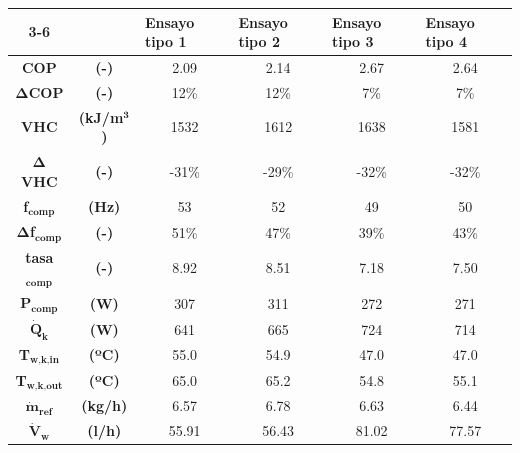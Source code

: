 
\begin{tabular}{cc|c|c|c|c|}
\cline{3-6}
\multicolumn{1}{l}{} & \multicolumn{1}{l|}{} & \multicolumn{1}{l|}{\textbf{Ensayo tipo 1}} & \multicolumn{1}{l|}{\textbf{Ensayo tipo 2}} & \multicolumn{1}{l|}{\textbf{Ensayo tipo 3}} & \multicolumn{1}{l|}{\textbf{Ensayo tipo 4}} \\ \hline
\multicolumn{1}{|c}{\textbf{COP}} & \textbf{(-)} & 2.09 & 2.14 & 2.67 & 2.64 \\ \hline
\multicolumn{1}{|c}{$\bm{\Delta}$\textbf{COP}} & \textbf{(-)} & 12\% & 12\% & 7\% & 7\% \\ \hline
\multicolumn{1}{|c}{\textbf{VHC}} & \textbf{(kJ/m$^\textbf{3}$)} & 1532 & 1612 & 1638 & 1581 \\ \hline
\multicolumn{1}{|c}{$\bm{\Delta}$\textbf{VHC}} & \textbf{(-)} & -31\% & -29\% & -32\% & -32\% \\ \hline
\multicolumn{1}{|c}{\textbf{f}$_\textbf{comp}$} & \textbf{(Hz)} & 53 & 52 & 49 & 50 \\ \hline
\multicolumn{1}{|c}{$\bm{\Delta}$\textbf{f}$_\textbf{comp}$} & \textbf{(-)} & 51\% & 47\% & 39\% & 43\% \\ \hline
\multicolumn{1}{|c}{\textbf{tasa}$_\textbf{comp}$} & \textbf{(-)} & 8.92 & 8.51 & 7.18 & 7.50 \\ \hline
\multicolumn{1}{|c}{\textbf{P}$_\textbf{comp}$} & \textbf{(W)} & 307 & 311 & 272 & 271 \\ \hline
\multicolumn{1}{|c}{$\dot{\textbf{Q}}_\textbf{k}$} & \textbf{(W)} & 641 & 665 & 724 & 714 \\ \hline
\multicolumn{1}{|c}{\textbf{T}$_\textbf{w,k,in}$} & \textbf{(ºC)} & 55.0 & 54.9 & 47.0 & 47.0 \\ \hline
\multicolumn{1}{|c}{\textbf{T}$_\textbf{w,k,out}$} & \textbf{(ºC)} & 65.0 & 65.2 & 54.8 & 55.1 \\ \hline
\multicolumn{1}{|c}{$\dot{\textbf{m}}_\textbf{ref}$} & \textbf{(kg/h)} & 6.57 & 6.78 & 6.63 & 6.44 \\ \hline
\multicolumn{1}{|c}{$\dot{\textbf{V}}_\textbf{w}$} & \textbf{(l/h)} & 55.91 & 56.43 & 81.02 & 77.57 \\ \hline
\end{tabular}
